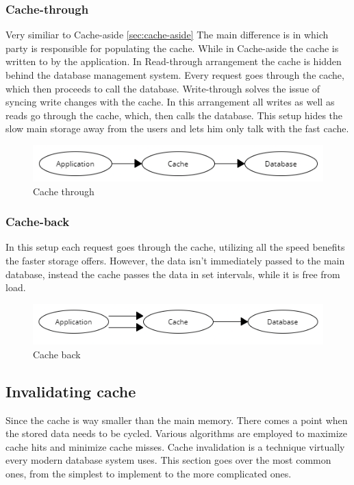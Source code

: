 \documentclass[10pt,twoside,a4paper]{article}
\begin{document}
\subsubsection{Cache-through}
Very similiar to Cache-aside \ref{sec:cache-aside} The main difference is in which party is responsible for populating the cache. While in Cache-aside the cache is written to by the application. In Read-through arrangement the cache is hidden behind the database management system. Every request goes through the cache, which then proceeds to call the database. Write-through solves the issue of syncing write changes with the cache. In this arrangement all writes as well as reads go through the cache, which, then calls the database. This setup hides the slow main storage away from the users and lets him only talk with the fast cache.

\begin{figure}[h]
    \centering
    \includegraphics[width=1\linewidth]{Cache-through.png}
    \caption{Cache through}
    \label{fig:cache-through}
\end{figure}

\subsubsection{Cache-back}
In this setup each request goes through the cache, utilizing all the speed benefits the faster storage offers. However, the data isn't immediately passed to the main database, instead the cache passes the data in set intervals, while it is free from load.

\begin{figure}[h]
    \centering
    \includegraphics[width=1\linewidth]{Cache-back.png}
    \caption{Cache back}
    \label{fig:cache-back}
\end{figure}

\subsection{Invalidating cache}
Since the cache is way smaller than the main memory. There comes a point when the stored data needs to be cycled. Various algorithms are employed to maximize cache hits and minimize cache misses. Cache invalidation is a technique virtually every modern database system uses. \cite{Redis} This section goes over the most common ones, from the simplest to implement to the more complicated ones. \cite{755618}
\end{document}
